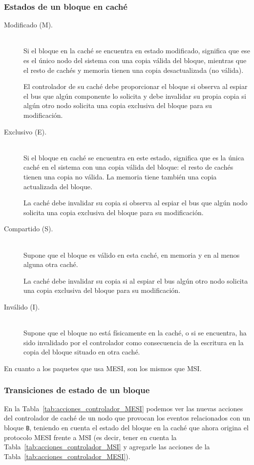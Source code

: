 \subsubsection{Estados de un bloque en caché}
\begin{description}
    \item [Modificado (M).]~\\
        Si el bloque en la caché se encuentra en estado modificado, significa que ese es el único nodo del sistema con una copia válida del bloque, mientras que el resto de cachés y memoria tienen una copia desactualizada (no válida).

        El controlador de su caché debe proporcionar el bloque si observa al espiar el bus que algún componente lo solicita y debe invalidar su propia copia si algún otro nodo solicita una copia exclusiva del bloque para su modificación.
    \item [Exclusivo (E).]~\\
        Si el bloque en caché se encuentra en este estado, significa que es la única caché en el sistema con una copia válida del bloque: el resto de cachés tienen una copia no válida. La memoria tiene también una copia actualizada del bloque. 

        La caché debe invalidar su copia si observa al espiar el bus que algún nodo solicita una copia exclusiva del bloque para su modificación.
    \item [Compartido (S).]~\\
        Supone que el bloque es válido en esta caché, en memoria y en al menos alguna otra caché. 

        La caché debe invalidar su copia si al espiar el bus algún otro nodo solicita una copia exclusiva del bloque para su modificación.
    \item [Inválido (I).]~\\
        Supone que el bloque no está físicamente en la caché, o si se encuentra, ha sido invalidado por el controlador como consecuencia de la escritura en la copia del bloque situado en otra caché.
\end{description}
En cuanto a los paquetes que usa MESI, son los mismos que MSI\@.

\subsubsection{Transiciones de estado de un bloque}
En la Tabla~\ref{tab:acciones_controlador_MESI} podemos ver las nuevas acciones del controlador de caché de un nodo que provocan los eventos relacionados con un bloque \verb|B|, teniendo en cuenta el estado del bloque en la caché que ahora origina el protocolo MESI frente a MSI (es decir, tener en cuenta la Tabla~\ref{tab:acciones_controlador_MSI} y agregarle las acciones de la Tabla~\ref{tab:acciones_controlador_MESI}).

